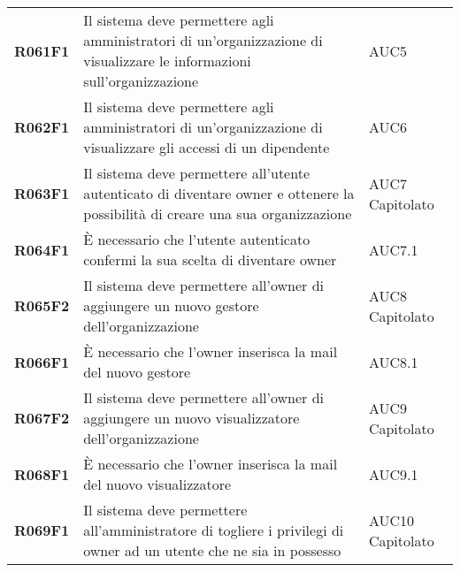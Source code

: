 \documentclass[../analisi-dei-requisiti.tex]{subfiles}
\begin{document}
\begin{longtable}[H]{>{\centering\bfseries}m{3cm} >{\centering}m{10cm} >{\centering\arraybackslash}m{3cm}}
  R061F1                  & Il sistema deve permettere agli amministratori di un'organizzazione di visualizzare le informazioni sull'organizzazione                                                            & AUC5                          \\
  R062F1                  & Il sistema deve permettere agli amministratori di un'organizzazione di visualizzare gli accessi di un dipendente                                                                   & AUC6                          \\

  R063F1                  & Il sistema deve permettere all'utente autenticato di diventare owner e ottenere la possibilità di creare una sua organizzazione                                                    & AUC7 Capitolato               \\
  R064F1                  & È necessario che l'utente autenticato confermi la sua scelta di diventare owner                                                                                                    & AUC7.1                        \\
  R065F2                  & Il sistema deve permettere all'owner di aggiungere un nuovo gestore dell'organizzazione                                                                                            & AUC8 Capitolato               \\
  R066F1                  & È necessario che l'owner inserisca la mail del nuovo gestore                                                                                                                       & AUC8.1                        \\
  R067F2                  & Il sistema deve permettere all'owner di aggiungere un nuovo visualizzatore dell'organizzazione                                                                                     & AUC9 Capitolato               \\
  R068F1                  & È necessario che l'owner inserisca la mail del nuovo visualizzatore                                                                                                                & AUC9.1                        \\
  R069F1                  & Il sistema deve permettere all'amministratore di togliere i privilegi di owner ad un utente che ne sia in possesso                                                                 & AUC10 Capitolato              \\

\end{longtable}
\end{document}
